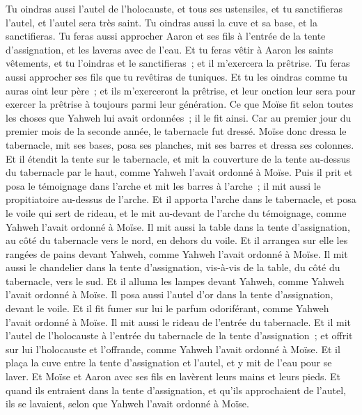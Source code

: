 \begin{multicols}{2}
Tu oindras aussi l'autel de l'holocauste, et tous ses ustensiles, et tu sanctifieras l'autel, et l'autel sera très saint.
Tu oindras aussi la cuve et sa base, et la sanctifieras.
Tu feras aussi approcher Aaron et ses fils à l'entrée de la tente d'assignation, et les laveras avec de l'eau.
Et tu feras vêtir à Aaron les saints vêtements, et tu l'oindras et le sanctifieras~; et il m'exercera la prêtrise.
Tu feras aussi approcher ses fils que tu revêtiras de tuniques.
 Et tu les oindras comme tu auras oint leur père~; et ils m'exerceront la prêtrise, et leur onction leur sera pour exercer la prêtrise à toujours parmi leur génération.
 Ce que Moïse fit selon toutes les choses que Yahweh lui avait ordonnées~; il le fit ainsi.
Car au premier jour du premier mois de la seconde année, le tabernacle fut dressé.
Moïse donc dressa le tabernacle, mit ses bases, posa ses planches, mit ses barres et dressa ses colonnes.
Et il étendit la tente sur le tabernacle, et mit la couverture de la tente au-dessus du tabernacle par le haut, comme Yahweh l'avait ordonné à Moïse.
Puis il prit et posa le témoignage dans l'arche et mit les barres à l'arche~; il mit aussi le propitiatoire au-dessus de l'arche.
Et il apporta l'arche dans le tabernacle, et posa le voile qui sert de rideau, et le mit au-devant de l'arche du témoignage, comme Yahweh l'avait ordonné à Moïse.
Il mit aussi la table dans la tente d'assignation, au côté du tabernacle vers le nord, en dehors du voile.
Et il arrangea sur elle les rangées de pains devant Yahweh, comme Yahweh l'avait ordonné à Moïse.
Il mit aussi le chandelier dans la tente d'assignation, vis-à-vis de la table, du côté du tabernacle, vers le sud.
Et il alluma les lampes devant Yahweh, comme Yahweh l'avait ordonné à Moïse.
Il posa aussi l'autel d'or dans la tente d'assignation, devant le voile.
Et il fit fumer sur lui le parfum odoriférant, comme Yahweh l'avait ordonné à Moïse.
Il mit aussi le rideau de l'entrée du tabernacle.
Et il mit l'autel de l'holocauste à l'entrée du tabernacle de la tente d'assignation~; et offrit sur lui l'holocauste et l'offrande, comme Yahweh l'avait ordonné à Moïse.
Et il plaça la cuve entre la tente d'assignation et l'autel, et y mit de l'eau pour se laver.
Et Moïse et Aaron avec ses fils en lavèrent leurs mains et leurs pieds.
Et quand ils entraient dans la tente d'assignation, et qu'ils approchaient de l'autel, ils se lavaient, selon que Yahweh l'avait ordonné à Moïse.

\end{multicols}
